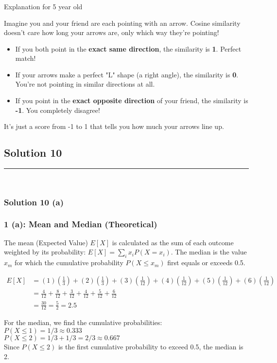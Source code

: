 \documentclass{article}
\begin{document}
\subsubsection*{\normalfont}{Explanation for 5 year old}

\parbox{\textwidth}{
Imagine you and your friend are each pointing with an arrow. Cosine similarity doesn't care how long your arrows are, only which way they're pointing!
\begin{itemize}
    \item If you both point in the \textbf{exact same direction}, the similarity is \textbf{1}. Perfect match!
    \item If your arrows make a perfect "L" shape (a right angle), the similarity is \textbf{0}. You're not pointing in similar directions at all.
    \item If you point in the \textbf{exact opposite direction} of your friend, the similarity is \textbf{-1}. You completely disagree!
\end{itemize}
It's just a score from -1 to 1 that tells you how much your arrows line up.
}

\newpage

\subsection*{Solution 10}
\noindent\rule{\textwidth}{0.4pt}\\
\subsubsection*{Solution  10 (a)}

\subsubsection*{1 (a): Mean and Median (Theoretical)}
\parbox{\textwidth}{The mean (Expected Value) $E[X]$ is calculated as the sum of each outcome weighted by its probability: $E[X] = \sum_{i} x_i P(X=x_i)$. The median is the value $x_m$ for which the cumulative probability $P(X \le x_m)$ first equals or exceeds 0.5.}
\begin{align*}
E[X] &= (1)\left(\frac{1}{3}\right) + (2)\left(\frac{1}{3}\right) + (3)\left(\frac{1}{12}\right) + (4)\left(\frac{1}{12}\right) + (5)\left(\frac{1}{12}\right) + (6)\left(\frac{1}{12}\right) \\
&= \frac{4}{12} + \frac{8}{12} + \frac{3}{12} + \frac{4}{12} + \frac{5}{12} + \frac{6}{12} \\
&= \frac{30}{12} = \frac{5}{2} = 2.5
\end{align*}
\parbox{\textwidth}{For the median, we find the cumulative probabilities: \\ $P(X \le 1) = 1/3 \approx 0.333$ \\ $P(X \le 2) = 1/3 + 1/3 = 2/3 \approx 0.667$ \\ Since $P(X \le 2)$ is the first cumulative probability to exceed 0.5, the median is 2.}
\end{document}
